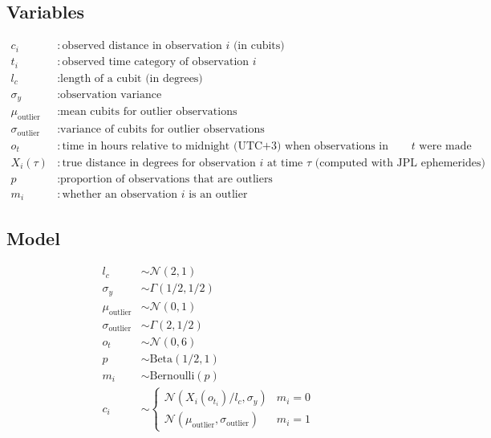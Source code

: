 \documentclass{article}
\begin{document}
\subsection{Variables}
\begin{align*}
    c_i &: \text{observed distance in observation $i$ (in cubits)} \\
    t_i &: \text{observed time category of observation $i$} \\
    l_c &: \text{length of a cubit (in degrees)} \\
    \sigma_y &: \text{observation variance} \\
    \mu_\text{outlier} &: \text{mean cubits for outlier observations} \\
    \sigma_\text{outlier} &: \text{variance of cubits for outlier observations} \\
    o_t &: \text{time in hours relative to midnight (UTC+3) when observations in category $t$ were made} \\
    X_i(\tau) &: \text{true distance in degrees for observation $i$ at time $\tau$ (computed with JPL ephemerides)} \\
    p &: \text{proportion of observations that are outliers} \\
    m_i &: \text{whether an observation $i$ is an outlier}
\end{align*}

\subsection{Model}
\begin{align*}
    l_c &\sim \mathcal{N}(2,1) \\
    \sigma_y &\sim \Gamma(1/2,1/2) \\
    \mu_\text{outlier} &\sim \mathcal{N}(0,1) \\
    \sigma_\text{outlier} &\sim \Gamma(2,1/2) \\
    o_t &\sim \mathcal{N}(0,6) \\
    p &\sim \text{Beta}(1/2,1) \\
    m_i &\sim \text{Bernoulli}(p) \\
    c_i &\sim \begin{cases}
        \mathcal{N}(X_i(o_{t_i}) / l_c, \sigma_y) & m_i = 0 \\
        \mathcal{N}(\mu_\text{outlier}, \sigma_\text{outlier}) & m_i = 1
    \end{cases}
\end{align*}
\end{document}
